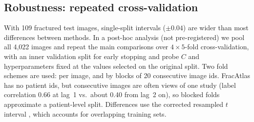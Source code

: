 \documentclass[11pt]{article}
\begin{document}
\subsection{Robustness: repeated cross-validation}
\label{sec:cv}

With 109 fractured test images, single-split intervals ($\pm0.04$) are wider than most differences between
methods. In a post-hoc analysis (not pre-registered) we pool all 4{,}022 images and repeat the main comparisons over
$4\times5$-fold cross-validation, with an inner validation split for early stopping and probe $C$ and
hyperparameters fixed at the values selected on the original split. Two fold schemes are used: per image, and by
blocks of 20 consecutive image ids. FracAtlas has no patient ids, but consecutive images are often views of one
study (label correlation 0.66 at lag~1 vs.\ about 0.40 from lag~2 on), so blocked folds approximate a patient-level
split. Differences use the corrected resampled $t$ interval \citep{nadeau2003inference}, which accounts for
overlapping training sets.

\begin{table}[t]
  \centering\small
  \caption{Cross-validation (20 folds; mean over folds). Differences: mean [95\% corrected resampled $t$ CI].
  ``No HW'': fracture AUROC on images without orthopedic hardware.}
  \label{tab:cv}
  \setlength{\tabcolsep}{3.5pt}
\end{table}
\end{document}
